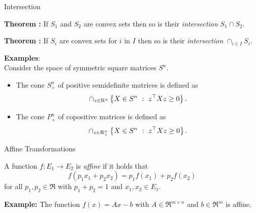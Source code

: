 \documentclass[9pt]{beamer}
\begin{document}
\begin{frame}{Intersection}

  \textbf{Theorem :} If $S_1$ and $S_2$ are convex sets then so is their \emph{intersection} $S_1\cap S_2$.

  \vspace{1em}
  
  \textbf{Theorem :} If $S_i$ are convex sets for $i$ in $I$ then so is their \emph{intersection} $\cap_{i\in I} S_i$.

  \vfill

  \textbf{Examples}:\\[0.5em]
  Consider the space of symmetric square matrices $S^{n}$.
  \begin{itemize}
  \item The cone $S_+^n$ of positive semidefinite matrices is defined as
    \[
      \cap_{z\in\mathrm{R}^n} \left\{ X\in S^n\ : \ z^\top X z\geq 0 \right\}.
    \]
  \item The cone $P_+^n$ of copositive matrices is defined as
    \[
      \cap_{z\in\mathrm{R}_+^n} \left\{ X\in S^n\ : \ z^\top X z\geq 0 \right\}.
    \]
  \end{itemize}

      
\end{frame}

\begin{frame}{Affine Transformations}
  

  A function $f:E_1\to E_2$ is \emph{affine} if it holds that
  \[
    f(p_1 x_1 + p_2 x_2) = p_1 f(x_1) + p_2 f(x_2)
  \]
  for all $p_1, p_2 \in \Re$ with $p_1+p_2=1$ and $x_1, x_2 \in E_1$.

  \vspace{1em}
  \textbf{Example:} 
  The function $f(x) = Ax - b$ with $A\in\Re^{m\times n}$ and $b\in\Re^m$ is affine.
  
  
  \vfill


  \vfill


\end{frame}
\end{document}
